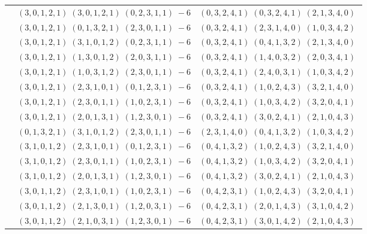 \documentclass[11pt]{article}
\begin{document}
\begin{longtable}[l]{|c|c|c|}
 \cline{2-3} 
 & $(3 ,0 ,1 ,2 ,1) \;(3 ,0 ,1 ,2 ,1) \;(0 ,2 ,3 ,1 ,1) \;-6$ & $(0 ,3 ,2 ,4 ,1) \;(0 ,3 ,2 ,4 ,1) \;(2 ,1 ,3 ,4 ,0) \;$\\ 
 \cline{2-3} 
 & $(3 ,0 ,1 ,2 ,1) \;(0 ,1 ,3 ,2 ,1) \;(2 ,3 ,0 ,1 ,1) \;-6$ & $(0 ,3 ,2 ,4 ,1) \;(2 ,3 ,1 ,4 ,0) \;(1 ,0 ,3 ,4 ,2) \;$\\ 
 \cline{2-3} 
 & $(3 ,0 ,1 ,2 ,1) \;(3 ,1 ,0 ,1 ,2) \;(0 ,2 ,3 ,1 ,1) \;-6$ & $(0 ,3 ,2 ,4 ,1) \;(0 ,4 ,1 ,3 ,2) \;(2 ,1 ,3 ,4 ,0) \;$\\ 
 \cline{2-3} 
 & $(3 ,0 ,1 ,2 ,1) \;(1 ,3 ,0 ,1 ,2) \;(2 ,0 ,3 ,1 ,1) \;-6$ & $(0 ,3 ,2 ,4 ,1) \;(1 ,4 ,0 ,3 ,2) \;(2 ,0 ,3 ,4 ,1) \;$\\ 
 \cline{2-3} 
 & $(3 ,0 ,1 ,2 ,1) \;(1 ,0 ,3 ,1 ,2) \;(2 ,3 ,0 ,1 ,1) \;-6$ & $(0 ,3 ,2 ,4 ,1) \;(2 ,4 ,0 ,3 ,1) \;(1 ,0 ,3 ,4 ,2) \;$\\ 
 \cline{2-3} 
 & $(3 ,0 ,1 ,2 ,1) \;(2 ,3 ,1 ,0 ,1) \;(0 ,1 ,2 ,3 ,1) \;-6$ & $(0 ,3 ,2 ,4 ,1) \;(1 ,0 ,2 ,4 ,3) \;(3 ,2 ,1 ,4 ,0) \;$\\ 
 \cline{2-3} 
 & $(3 ,0 ,1 ,2 ,1) \;(2 ,3 ,0 ,1 ,1) \;(1 ,0 ,2 ,3 ,1) \;-6$ & $(0 ,3 ,2 ,4 ,1) \;(1 ,0 ,3 ,4 ,2) \;(3 ,2 ,0 ,4 ,1) \;$\\ 
 \cline{2-3} 
 & $(3 ,0 ,1 ,2 ,1) \;(2 ,0 ,1 ,3 ,1) \;(1 ,2 ,3 ,0 ,1) \;-6$ & $(0 ,3 ,2 ,4 ,1) \;(3 ,0 ,2 ,4 ,1) \;(2 ,1 ,0 ,4 ,3) \;$\\ 
 \cline{2-3} 
 & $(0 ,1 ,3 ,2 ,1) \;(3 ,1 ,0 ,1 ,2) \;(2 ,3 ,0 ,1 ,1) \;-6$ & $(2 ,3 ,1 ,4 ,0) \;(0 ,4 ,1 ,3 ,2) \;(1 ,0 ,3 ,4 ,2) \;$\\ 
 \cline{2-3} 
 & $(3 ,1 ,0 ,1 ,2) \;(2 ,3 ,1 ,0 ,1) \;(0 ,1 ,2 ,3 ,1) \;-6$ & $(0 ,4 ,1 ,3 ,2) \;(1 ,0 ,2 ,4 ,3) \;(3 ,2 ,1 ,4 ,0) \;$\\ 
 \cline{2-3} 
 & $(3 ,1 ,0 ,1 ,2) \;(2 ,3 ,0 ,1 ,1) \;(1 ,0 ,2 ,3 ,1) \;-6$ & $(0 ,4 ,1 ,3 ,2) \;(1 ,0 ,3 ,4 ,2) \;(3 ,2 ,0 ,4 ,1) \;$\\ 
 \cline{2-3} 
 & $(3 ,1 ,0 ,1 ,2) \;(2 ,0 ,1 ,3 ,1) \;(1 ,2 ,3 ,0 ,1) \;-6$ & $(0 ,4 ,1 ,3 ,2) \;(3 ,0 ,2 ,4 ,1) \;(2 ,1 ,0 ,4 ,3) \;$\\ 
 \cline{2-3} 
 & $(3 ,0 ,1 ,1 ,2) \;(2 ,3 ,1 ,0 ,1) \;(1 ,0 ,2 ,3 ,1) \;-6$ & $(0 ,4 ,2 ,3 ,1) \;(1 ,0 ,2 ,4 ,3) \;(3 ,2 ,0 ,4 ,1) \;$\\ 
 \cline{2-3} 
 & $(3 ,0 ,1 ,1 ,2) \;(2 ,1 ,3 ,0 ,1) \;(1 ,2 ,0 ,3 ,1) \;-6$ & $(0 ,4 ,2 ,3 ,1) \;(2 ,0 ,1 ,4 ,3) \;(3 ,1 ,0 ,4 ,2) \;$\\ 
 \cline{2-3} 
 & $(3 ,0 ,1 ,1 ,2) \;(2 ,1 ,0 ,3 ,1) \;(1 ,2 ,3 ,0 ,1) \;-6$ & $(0 ,4 ,2 ,3 ,1) \;(3 ,0 ,1 ,4 ,2) \;(2 ,1 ,0 ,4 ,3) \;$\\ 

\end{longtable}
\end{document}
